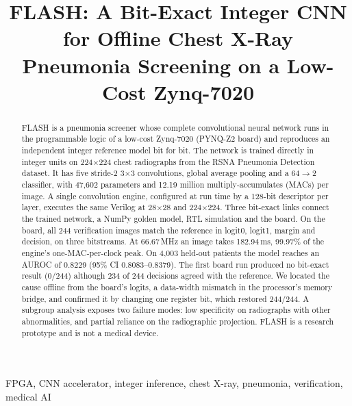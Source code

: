 \documentclass[conference]{IEEEtran}
\begin{document}
\title{FLASH: A Bit-Exact Integer CNN for Offline Chest X-Ray Pneumonia Screening on a Low-Cost Zynq-7020}

\author{
}

\maketitle

\begin{abstract}
FLASH is a pneumonia screener whose complete convolutional neural network runs in the
programmable logic of a low-cost Zynq-7020 (PYNQ-Z2 board) and reproduces an independent integer
reference model bit for bit. The network is trained directly in integer units on 224$\times$224
chest radiographs from the RSNA Pneumonia Detection dataset. It has five stride-2 3$\times$3
convolutions, global average pooling and a 64$\to$2 classifier, with 47,602 parameters and 12.19
million multiply-accumulates (MACs) per image. A single convolution engine, configured at run
time by a 128-bit descriptor per layer, executes the same Verilog at 28$\times$28 and
224$\times$224. Three bit-exact links connect the trained network, a NumPy golden model, RTL
simulation and the board. On the board, all 244 verification images match the reference in
logit0, logit1, margin and decision, on three bitstreams. At 66.67\,MHz an image takes
182.94\,ms, 99.97\% of the engine's one-MAC-per-clock peak. On 4,003 held-out patients the model
reaches an AUROC of 0.8229 (95\% CI 0.8083--0.8379). The first board run produced no bit-exact
result (0/244) although 234 of 244 decisions agreed with the reference. We located the cause
offline from the board's logits, a data-width mismatch in the processor's memory bridge, and
confirmed it by changing one register bit, which restored 244/244. A subgroup analysis exposes two
failure modes: low specificity on radiographs with other abnormalities, and partial reliance on
the radiographic projection. FLASH is a research prototype and is not a medical device.
\end{abstract}

\begin{IEEEkeywords}
FPGA, CNN accelerator, integer inference, chest X-ray, pneumonia, verification, medical AI
\end{IEEEkeywords}

\end{document}
